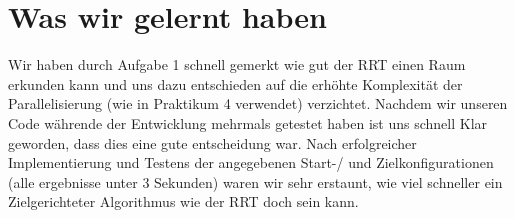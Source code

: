 \documentclass[a4paper]{scrartcl}
\begin{document}
	
\section*{Was wir gelernt haben}

 Wir haben durch Aufgabe 1 schnell gemerkt wie gut der RRT einen Raum erkunden kann und uns dazu entschieden auf die erhöhte Komplexität der Parallelisierung (wie in Praktikum 4 verwendet) verzichtet. Nachdem wir unseren Code währende der Entwicklung mehrmals getestet haben ist uns schnell Klar geworden, dass dies eine gute entscheidung war. Nach erfolgreicher Implementierung und Testens der angegebenen Start-/ und Zielkonfigurationen (alle ergebnisse unter 3 Sekunden) waren wir sehr erstaunt, wie viel schneller ein Zielgerichteter Algorithmus wie der RRT doch sein kann.
\end{document}
